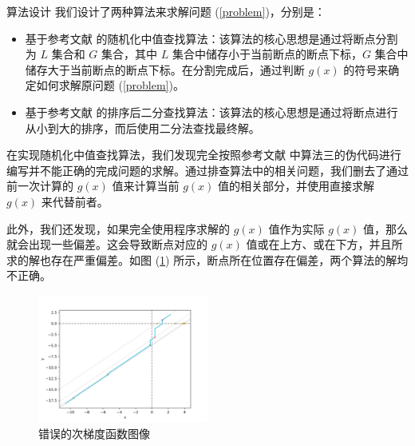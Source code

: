 \documentclass[aspectratio=169]{beamer}
\newcommand{\enableindent}{\setlength{\parskip}{6pt}\setlength{\parindent}{2em}}
\begin{document}
\begin{frame}{算法设计}
    我们设计了两种算法来求解问题 (\ref{problem})，分别是：

    \begin{itemize}
        \item 基于参考文献 \cite{10.1016/j.patcog.2017.02.006} 的随机化中值查找算法：该算法的核心思想是通过将断点分割为 $L$ 集合和 $G$ 集合，其中 $L$ 集合中储存小于当前断点的断点下标，$G$ 集合中储存大于当前断点的断点下标。在分割完成后，通过判断 $g(x)$ 的符号来确定如何求解原问题 (\ref{problem})。
        \item 基于参考文献 \cite{10.5555/1577069.1755859} 的排序后二分查找算法：该算法的核心思想是通过将断点进行从小到大的排序，而后使用二分法查找最终解。
    \end{itemize}

    \framebreak

    \enableindent

    在实现随机化中值查找算法，我们发现完全按照参考文献 \cite{10.1016/j.patcog.2017.02.006} 中算法三的伪代码进行编写并不能正确的完成问题的求解。通过排查算法中的相关问题，我们删去了通过前一次计算的 $g(x)$ 值来计算当前 $g(x)$ 值的相关部分，并使用直接求解 $g(x)$ 来代替前者。

    此外，我们还发现，如果完全使用程序求解的 $g(x)$ 值作为实际 $g(x)$ 值，那么就会出现一些偏差。这会导致断点对应的 $g(x)$ 值或在上方、或在下方，并且所求的解也存在严重偏差。如图 (\ref{Error}) 所示，断点所在位置存在偏差，两个算法的解均不正确。

    \framebreak

    \begin{figure}[htb]
        \centering
        \includegraphics[width=0.5\textwidth]{images/Error.png}
        \caption{错误的次梯度函数图像}
        \label{Error}
    \end{figure}
\end{frame}
\end{document}
